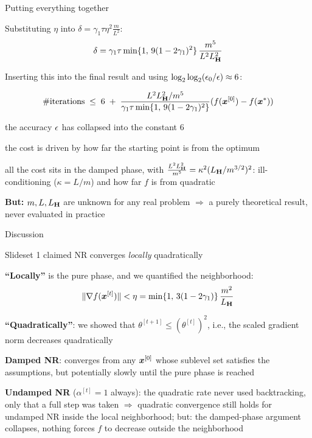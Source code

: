 \documentclass[11pt,compress,t,notes=noshow, xcolor=table]{beamer}
\newcommand{\LH}{L_{\H}}
\begin{document}
\begin{framei}[fs=small]{Putting everything together}
\item Substituting $\eta$ into $\delta = \gamma_1 \tau \eta^2 \frac{m}{L^2}$:
$$\delta = \gamma_1 \tau \min\{1, \, 9(1 - 2\gamma_1)^2\} \, \frac{m^5}{L^2 \LH^2}$$
\item Inserting this into the final result and using $\log_2 \log_2 (\epsilon_0/\epsilon) \approx 6$:
\begin{framed}
$$\#\text{iterations} \; \le \; 6 \; + \;
\frac{L^2 \LH^2 / m^5}{\gamma_1 \tau \min\{1, \, 9(1 - 2\gamma_1)^2\}}
(f(\xv^{[0]}) - f(\xvs))$$
\end{framed}
\item the accuracy $\epsilon$ has collapsed into the constant $6$
\item the cost is driven by how far the
starting point is from the optimum
\item all the cost sits in the damped phase, with
$\frac{L^2 \LH^2}{m^5} = \kappa^2 (\LH/m^{3/2})^2$: ill-conditioning ($\kappa = L/m$) and how far $f$ is
from quadratic
\item \textbf{But:} $m, L, \LH$ are unknown for any real problem $\Rightarrow$ a purely theoretical result,
never evaluated in practice
\end{framei}


\begin{framei}[fs=small]{Discussion}
\item Slideset 1 claimed NR converges \textit{locally} quadratically
\item \textbf{``Locally''} is the pure phase, and we quantified the neighborhood:
$$\|\nabla f(\xv^{[t]})\| < \eta = \min\{1, \, 3(1 - 2\gamma_1)\} \, \frac{m^2}{\LH}$$
\item \textbf{``Quadratically''}: we showed that $\theta^{[t+1]} \le (\theta^{[t]})^2$, i.e., the scaled gradient norm decreases quadratically
\item \textbf{Damped NR}: converges from any $\bm{x}^{[0]}$ whose sublevel set satisfies the assumptions, but potentially slowly until the pure phase is reached
\item \textbf{Undamped NR} ($\alpha^{[t]} = 1$ always): the quadratic rate never used backtracking, only
that a full step was taken $\Rightarrow$ quadratic convergence
still holds for undamped NR inside the local neighborhood; but: the damped-phase argument collapses, nothing forces $f$ to decrease outside the neighborhood
\end{framei}
\end{document}
